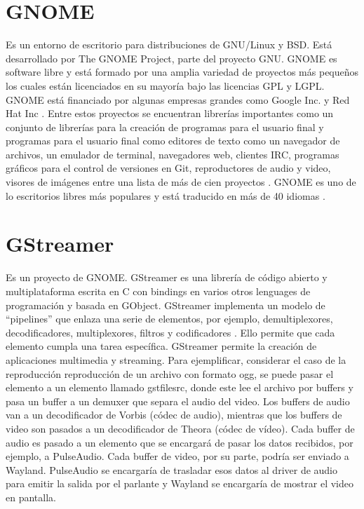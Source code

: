 \documentclass[a4paper,openright,12pt]{report}
\begin{document}
\section{GNOME}
Es un entorno de escritorio para distribuciones de GNU/Linux y BSD. Está
desarrollado por The GNOME Project, parte del proyecto GNU. GNOME es software
libre y está formado por una amplia variedad de proyectos más pequeños los
cuales están licenciados en su mayoría bajo las licencias GPL y LGPL. GNOME
está financiado por algunas empresas grandes como Google Inc. y Red Hat Inc
\cite{GNOMEFoundation}. Entre estos proyectos se encuentran librerías
importantes como un conjunto de librerías para la creación de programas para
el usuario final y programas para el usuario final como editores de texto como
un navegador de archivos, un emulador de terminal, navegadores web, clientes
IRC, programas gráficos para el control de versiones en Git, reproductores de
audio y video, visores de imágenes entre una lista de más de cien proyectos
\cite{GNOMEProjects}. GNOME es uno de lo escritorios libres más populares y
está traducido en más de 40 idiomas \cite{GNOMETranslationTeams}.

\section{GStreamer}
Es un proyecto de GNOME. GStreamer es una librería de código abierto y
multiplataforma escrita en C con bindings en varios otros lenguages de
programación y basada en GObject. GStreamer implementa un modelo de
“pipelines” que enlaza una serie de elementos, por ejemplo, demultiplexores,
decodificadores, multiplexores, filtros y codificadores \cite{GStreamerFeatures}.
Ello permite que cada elemento cumpla una tarea específica. GStreamer permite
la creación de aplicaciones multimedia y streaming. Para ejemplificar,
considerar el caso de la reproducción reproducción de un archivo con formato
ogg, se puede pasar el elemento a un elemento llamado gstfilesrc, donde este lee
el archivo por buffers y pasa un buffer a un demuxer que separa el audio del
video. Los buffers de audio van a un decodificador de Vorbis (códec de audio),
mientras que los buffers de video son pasados a un decodificador de Theora
(códec de vídeo).
Cada buffer de audio es pasado a un elemento que se encargará de pasar los datos
recibidos, por ejemplo, a PulseAudio. Cada buffer de video, por su parte, podría
ser enviado a Wayland. PulseAudio se encargaría de trasladar esos datos al
driver de audio para emitir la salida por el parlante y Wayland se encargaría
de mostrar el video en pantalla.
\end{document}
